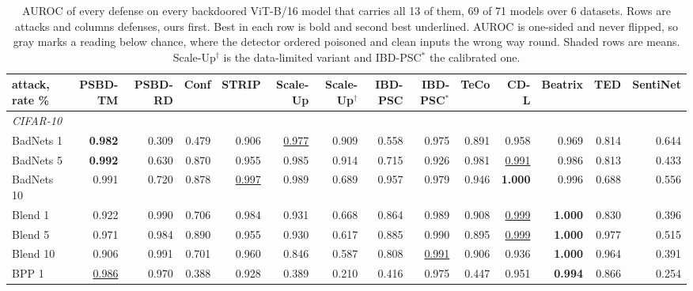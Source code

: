 \begin{table}[htbp]
\centering
\small
\caption{AUROC of every defense on every backdoored ViT-B/16 model that carries all 13 of them, 69 of 71 models over 6 datasets. Rows are attacks and columns defenses, ours first. Best in each row is bold and second best underlined. AUROC is one-sided and never flipped, so gray marks a reading below chance, where the detector ordered poisoned and clean inputs the wrong way round. Shaded rows are means. Scale-Up$^\dagger$ is the data-limited variant and IBD-PSC$^\ast$ the calibrated one.}
\label{tab:detectors-auroc}
\begin{adjustbox}{max width=\textwidth}
\begin{tabular}{lrrrrrrrrrrrrr}
\toprule
attack, rate \% & PSBD-TM & PSBD-RD & Conf & STRIP & Scale-Up & Scale-Up$^\dagger$ & IBD-PSC & IBD-PSC$^\ast$ & TeCo & CD-L & Beatrix & TED & SentiNet \\
\midrule
\multicolumn{14}{l}{\emph{CIFAR-10}} \\
BadNets 1 & \textbf{0.982} & \textcolor{black!45}{0.309} & \textcolor{black!45}{0.479} & 0.906 & \underline{0.977} & 0.909 & 0.558 & 0.975 & 0.891 & 0.958 & 0.969 & 0.814 & 0.644 \\
BadNets 5 & \textbf{0.992} & 0.630 & 0.870 & 0.955 & 0.985 & 0.914 & 0.715 & 0.926 & 0.981 & \underline{0.991} & 0.986 & 0.813 & \textcolor{black!45}{0.433} \\
BadNets 10 & 0.991 & 0.720 & 0.878 & \underline{0.997} & 0.989 & 0.689 & 0.957 & 0.979 & 0.946 & \textbf{1.000} & 0.996 & 0.688 & 0.556 \\
Blend 1 & 0.922 & 0.990 & 0.706 & 0.984 & 0.931 & 0.668 & 0.864 & 0.989 & 0.908 & \underline{0.999} & \textbf{1.000} & 0.830 & \textcolor{black!45}{0.396} \\
Blend 5 & 0.971 & 0.984 & 0.890 & 0.955 & 0.930 & 0.617 & 0.885 & 0.990 & 0.895 & \underline{0.999} & \textbf{1.000} & 0.977 & 0.515 \\
Blend 10 & 0.906 & 0.991 & 0.701 & 0.960 & 0.846 & 0.587 & 0.808 & \underline{0.991} & 0.906 & 0.936 & \textbf{1.000} & 0.964 & \textcolor{black!45}{0.391} \\
BPP 1 & \underline{0.986} & 0.970 & \textcolor{black!45}{0.388} & 0.928 & \textcolor{black!45}{0.389} & \textcolor{black!45}{0.210} & \textcolor{black!45}{0.416} & 0.975 & \textcolor{black!45}{0.447} & 0.951 & \textbf{0.994} & 0.866 & \textcolor{black!45}{0.254} \\

\end{tabular}
\end{adjustbox}
\end{table}
